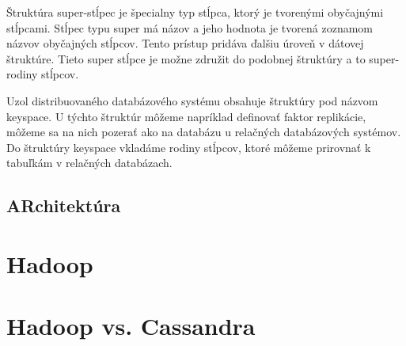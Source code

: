 \documentclass[11pt,twoside,a4paper]{book}
\begin{document}
Štruktúra super-stĺpec je špecialny typ stĺpca, ktorý je tvorenými obyčajnými stĺpcami. Stĺpec typu super má názov a jeho hodnota je tvorená zoznamom názvov obyčajných stĺpcov. Tento prístup pridáva ďalšiu úroveň v dátovej štruktúre. Tieto super stĺpce je možne združit do podobnej štruktúry a to super-rodiny stĺpcov. 

Uzol distribuovaného databázového systému obsahuje štruktúry pod názvom keyspace. U týchto štruktúr môžeme napríklad definovať faktor replikácie, môžeme sa na nich pozerať ako na databázu u relačných databázových systémov. Do štruktúry keyspace vkladáme rodiny stĺpcov, ktoré môžeme prirovnať k tabuľkám v relačných databázach. 


\subsection{ARchitektúra}








\section{Hadoop}


\section{Hadoop vs. Cassandra}

% 
% 
\end{document}
